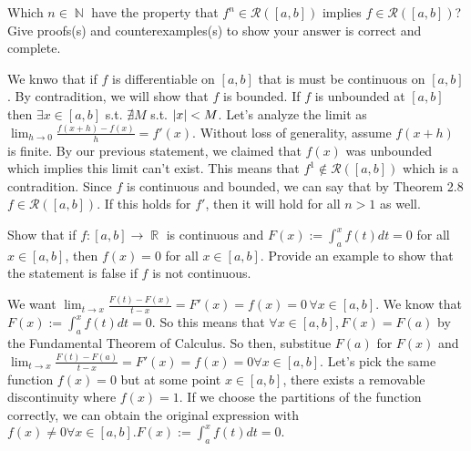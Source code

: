\documentclass[12pt,letterpaper,boxed]{hmcpset}
\DeclareMathOperator{\N}{\mathbb{N}}
\DeclareMathOperator{\R}{\mathbb{R}}
\DeclarePairedDelimiter\abs{\lvert}{\rvert}%
\begin{document}

\begin{problem}[Exercise 2.12]
Which $n\in\N$ have the property that $f^{n} \in \mathcal{R}([a,b])$ implies $f\in\mathcal{R}([a,b])$? Give proofs(s) and counterexamples(s) to show your answer is correct and complete.
\end{problem}

\begin{solution}
We knwo that if $f$ is differentiable on $[a,b]$ that is must be continuous on $[a,b]$. By contradition, we will show that $f$ is bounded. If $f$ is unbounded at $[a,b]$ then $\exists x\in[a,b]$ s.t. $\nexists M$ s.t. $\abs{x} < M$. Let's analyze the limit as $\lim_{h \rightarrow 0}\frac{f(x + h) - f(x)}{h} = f'(x)$. Without loss of generality, assume $f(x + h)$ is finite. By our previous statement, we claimed that $f(x)$ was unbounded which implies this limit can't exist. This means that $f^{1} \notin \mathcal{R}([a,b])$ which is a contradition. Since $f$ is continuous and bounded, we can say that by Theorem 2.8 $f\in\mathcal{R}([a,b]).$ If this holds for $f'$, then it will hold for all $n > 1$ as well.
\end{solution}

\begin{problem}[Exercise 2.15]
Show that if $f : [a, b] \rightarrow \R$ is continuous and $F(x) := \int_{a}^{x} f(t) dt = 0$ for all $x \in [a, b]$, then $f(x)=0$ for all $x \in [a,b].$ Provide an example to show that the statement is false if $f$ is not continuous.
\end{problem}

\begin{solution}
We want $\lim_{t\rightarrow x} \frac{F(t) - F(x)}{t - x} = F'(x) = f(x) = 0\, \forall x \in [a, b]$. We know that $F(x) := \int_{a}^{x} f(t) dt = 0.$ So this means that $\forall x\in[a,b], F(x)=F(a)$ by the Fundamental Theorem of Calculus. So then, substitue $F(a)$ for $F(x)$ and $\lim_{t \rightarrow x} \frac{F(t) - F(a)}{t - x} = F'(x)= f(x) = 0 \forall x\in[a, b].$ Let's pick the same function $f(x) = 0$ but at some point $x \in [a,b]$, there exists a removable discontinuity where $f(x) = 1$. If we choose the partitions of the function correctly, we can obtain the original expression with $f(x)\neq0 \forall x \in [a,b].F(x) := \int_{a}^{x} f(t) dt = 0.$
\end{solution}
\end{document}
